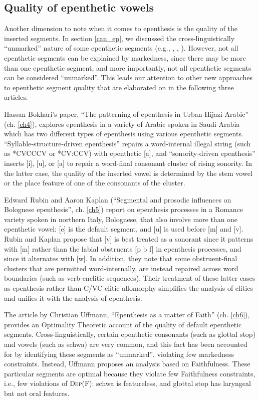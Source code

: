 \documentclass[output=paper,colorlinks,citecolor=brown]{langscibook}
\begin{document}
\subsection{Quality of epenthetic vowels}
Another dimension to note when it comes to epenthesis is the quality of the inserted segments. In section \ref{can_ep}, we discussed the cross-linguistically “unmarked” nature of some epenthetic segments (e.g., \citealt{Zwicky1972}, \citealt{Dinnsen1980}, \citealt{Lombardi2002}). However, not all epenthetic segments can be explained by markedness, since there may be more than one epenthetic segment, and more importantly, not all epenthetic segments can be considered “unmarked”. This leads our attention to other new approaches to epenthetic segment quality that are elaborated on in the following three articles. 

Hassan Bokhari’s paper, “The patterning of epenthesis in Urban Hijazi Arabic” (ch. \ref{ch4}), explores epenthesis in a variety of Arabic spoken in Saudi Arabia which has two different types of epenthesis using various epenthetic segments. “Syllable-structure-driven epenthesis” repairs a word-internal illegal string (such as *CVCCCV or *CV:CCV) with epenthetic [a], and “sonority-driven epenthesis” inserts [i], [u], or [a] to repair a word-final consonant cluster of rising sonority. In the latter case, the quality of the inserted vowel is determined by the stem vowel or the place feature of one of the consonants of the cluster.

Edward Rubin and Aaron Kaplan (“Segmental and prosodic influences on Bolognese epenthesis”, ch. \ref{ch5}) report on epenthesis processes in a Romance variety spoken in northern Italy, Bolognese, that also involve more than one epenthetic vowel: [e] is the default segment, and [u] is used before [m] and [v]. Rubin and Kaplan propose that [v] is best treated as a sonorant since it patterns with [m] rather than the labial obstruents [p b f] in epenthesis processes, and since it alternates with [w]. In addition, they note that some obstruent-final clusters that are permitted word-internally, are instead repaired across word boundaries (such as verb-enclitic sequences). Their treatment of these latter cases as epenthesis rather than C/VC clitic allomorphy simplifies the analysis of clitics and unifies it with the analysis of epenthesis. 

The article by Christian Uffmann, “Epenthesis as a matter of Faith” (ch. \ref{ch6}), provides an Optimality Theoretic account of the quality of default epenthetic segments. Cross-linguistically, certain epenthetic consonants (such as glottal stop) and vowels (such as schwa) are very common, and this fact has been accounted for by identifying these segments as “unmarked”, violating few markedness constraints. Instead, Uffmann proposes an analysis based on Faithfulness. These particular segments are optimal because they violate few Faithfulness constraints, i.e., few violations of \textsc{Dep(F)}: schwa is featureless, and glottal stop has laryngeal but not oral features.
\end{document}
